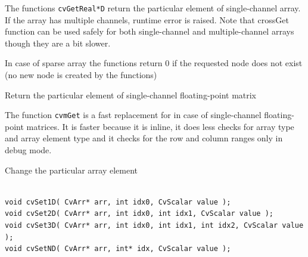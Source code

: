 \begin{description}
\end{description}


The functions \texttt{cvGetReal*D} return the particular element of single-channel array. If the array has multiple channels, runtime error is raised. Note that cross{Get} function can be used safely for both single-channel and multiple-channel arrays though they are a bit slower.

In case of sparse array the functions return 0 if the requested node does not exist (no new node is created by the functions)

\label{mGet}

Return the particular element of single-channel floating-point matrix


\begin{description}
\end{description}

The function \texttt{cvmGet} is a fast replacement for 
in case of single-channel floating-point matrices. It is faster because
it is inline, it does less checks for array type and array element type
and it checks for the row and column ranges only in debug mode.

\label{SetnD}

Change the particular array element

\begin{lstlisting}

void cvSet1D( CvArr* arr, int idx0, CvScalar value );
void cvSet2D( CvArr* arr, int idx0, int idx1, CvScalar value );
void cvSet3D( CvArr* arr, int idx0, int idx1, int idx2, CvScalar value );
void cvSetND( CvArr* arr, int* idx, CvScalar value );

\end{lstlisting}

\begin{description}
\end{description}


